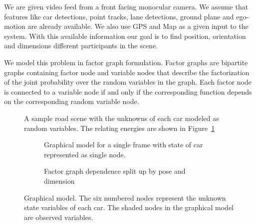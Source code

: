 We are given video feed from a front facing monocular camera. We assume that features like car detections, point tracks, lane detections, ground plane and ego-motion are already available. We also use GPS and Map as a given input to the system. With this available information our goal is to find position, orientation and dimensions different participants in the scene.

We model this problem in factor graph formulation. Factor graphs are bipartite graphs containing factor node and variable nodes that describe the factorization of the joint probability over the random variables in the graph. Each factor node is connected to a variable node if and only if the corresponding function depends on the corresponding random variable node.

\begin{figure}
  \centering
  \newcommand{\imagewidth}{\textwidth}
  
  \caption{A sample road scene with the unknowns of each car modeled as random variables. 
  The relating energies are shown in Figure~\ref{fig:graphmodel}}
\end{figure}
\begin{figure}
  \begin{subfigure}[b]{0.55\textwidth}
    
    \caption{Graphical model for a single frame with state of car represented
    as single node.}
  \end{subfigure}
  \begin{subfigure}[b]{0.45\textwidth}
    \tikzset{/tikz/x=0.8cm,/tikz/y=0.8cm}
    
    \caption{Factor graph dependence split up by pose and dimension}
  \end{subfigure}
\caption{Graphical model. The six numbered nodes represent the unknown state variables of each car. The shaded nodes in the graphical model are observed variables. %
}
  \label{fig:graphmodel}
\end{figure}
\begin{figure}
  \centering
\end{figure}


